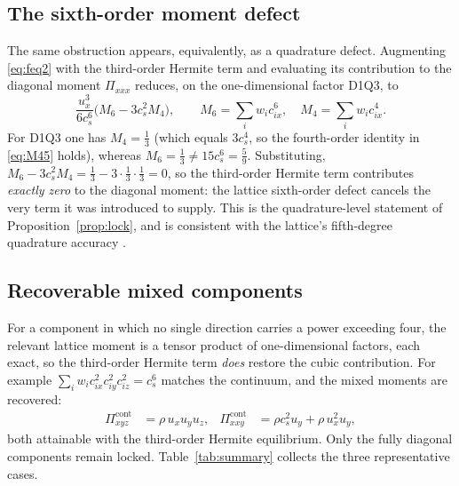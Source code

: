 \documentclass[preprint,11pt]{elsarticle}
\newcommand{\cs}{c_s}
\newcommand{\sumi}{\sum_i}
\begin{document}
\subsection{The sixth-order moment defect}

The same obstruction appears, equivalently, as a quadrature defect.
Augmenting \eqref{eq:feq2} with the third-order Hermite term and evaluating
its contribution to the diagonal moment $\Pi_{xxx}$ reduces, on the
one-dimensional factor D1Q3, to
\begin{equation}
\frac{u_x^{3}}{6\cs^{6}}\big(M_6-3\cs^{2}M_4\big),
\qquad
M_6=\sumi w_i c_{ix}^{6},\quad M_4=\sumi w_i c_{ix}^{4}.
\label{eq:sixth}
\end{equation}
For D1Q3 one has $M_4=\tfrac13$ (which equals $3\cs^{4}$, so the
fourth-order identity in \eqref{eq:M45} holds), whereas
$M_6=\tfrac13\neq 15\cs^{6}=\tfrac59$. Substituting,
$M_6-3\cs^{2}M_4=\tfrac13-3\cdot\tfrac13\cdot\tfrac13=0$, so the third-order
Hermite term contributes \emph{exactly zero} to the diagonal moment: the
lattice sixth-order defect cancels the very term it was introduced to
supply. This is the quadrature-level statement of Proposition~\ref{prop:lock},
and is consistent with the lattice's fifth-degree quadrature accuracy
\citep{ShanYuanChen2006}.

\subsection{Recoverable mixed components}

For a component in which no single direction carries a power exceeding four,
the relevant lattice moment is a tensor product of one-dimensional factors,
each exact, so the third-order Hermite term \emph{does} restore the cubic
contribution. For example $\sum_i w_i c_{ix}^{2}c_{iy}^{2}c_{iz}^{2}
=\cs^{6}$ matches the continuum, and the mixed moments are recovered:
\begin{align}
\Pi_{xyz}^{\text{cont}}&=\rho\,u_x u_y u_z, &
\Pi_{xxy}^{\text{cont}}&=\rho\cs^{2}u_y+\rho\,u_x^{2}u_y ,
\label{eq:mixed}
\end{align}
both attainable with the third-order Hermite equilibrium. Only the fully
diagonal components remain locked. Table~\ref{tab:summary} collects the three
representative cases.
\end{document}
